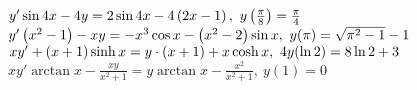	\begin{enumtasks}
			
		\itemstar \( y' \sin{4x} - 4y = 2 \sin{4x} - 4 \left( 2x - 1 \right), ~ y\left( \frac{\pi}{8} \right) = \frac{\pi}{4} \) 			%
		\itemstar \( y' \left( x^2 - 1 \right) - xy = -x^3 \cos{x} - \left( x^2 - 2 \right) \sin{x}, ~ y(\pi) = \sqrt{\pi^2 - 1} - 1 \) 	%
		\itemstar \( xy' + \left( x + 1 \right) \sinh{x} = y \cdot \left( x + 1 \right) + x \cosh{x}, ~ 4y(\ln{2}) = 8 \ln{2} + 3 \) 		%
		\itemstar \( xy' \arctan{x} - \frac{xy}{x^2 + 1} = y \arctan{x} - \frac{x^2}{x^2 + 1}, ~ y(1) = 0  \) 				%

	\end{enumtasks}

